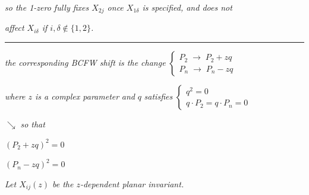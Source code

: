 \documentclass[12pt]{article}
\newcommand{\hw}[1]{\textit{#1}}
\begin{document}
\vspace{0.6cm}

\noindent
\hw{so the 1-zero fully fixes $X_{2j}$ once $X_{1\delta}$ is specified, and does not}

\smallskip
\noindent
\hw{affect\; $X_{i\delta}$\; if\; $i, \delta \notin \{1, 2\}$.}

\vspace{0.5cm}

\noindent\rule{4cm}{0.6pt}

\vspace{0.5cm}

\noindent
\hw{the corresponding BCFW shift is the change}
\hfill
$\left\{\begin{array}{l}
P_2 \;\to\; P_2 + zq \\[6pt]
P_n \;\to\; P_n - zq
\end{array}\right.$

\vspace{0.5cm}

\noindent
\hw{where $z$ is a complex parameter} \qquad \hw{and} \qquad $q$ \;\hw{satisfies}
\hfill
$\left\{\begin{array}{l}
q^2 = 0 \\[4pt]
q \cdot P_2 = q \cdot P_n = 0
\end{array}\right.$

\vspace{0.2cm}

\hfill
{\color{orange1}\small $\searrow$ \;\hw{so that}}

\hfill
{\color{orange1}\small $(P_2 + zq)^2 = 0$}

\hfill
{\color{orange1}\small $(P_n - zq)^2 = 0$}

\vspace{0.4cm}

\noindent
\hw{Let $X_{ij}(z)$ be the $z$-dependent planar invariant.}
\end{document}

